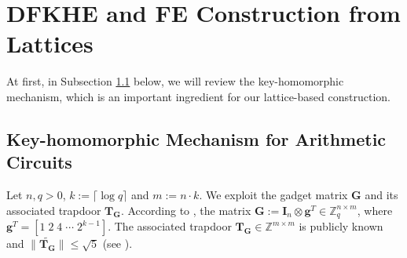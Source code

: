 \documentclass[runningheads,10pt]{llncs}
\begin{document}
\section{DFKHE and FE Construction from Lattices} \label{instan}

At first, in Subsection \ref{gad} below, we will review the key-homomorphic mechanism,
which is an important ingredient for our lattice-based construction. %

\subsection{Key-homomorphic Mechanism for Arithmetic Circuits} \label{gad}
\iffalse
\begin{lemma}[Bit decomposition]
	$\mathbf{K} \leftarrow \mathsf{BitDec}(\mathbf{A})$:  
	This is a DPT algorithm that takes a matrix $\mathbf{A}\in \mathbb{Z}_q^{n \times m}$ as its input and
	returns a matrix $\mathbf{R}\in \mathbb{Z}_q^{m \times m}$, in which each element $a \in \mathbb{Z}_q$ of $\mathbf{A}$ 
	is decomposed into a column binary vector $\mathbf{r}=[a_0 \cdots a_{k-1}]^T\in \mathbb{Z}_q^{k}$, where the bits $a_i$'s are ordered from least significant bit to most significant bit.
\end{lemma}

\begin{lemma}[{\cite[Claim 2.3]{BGG+14}}]
	Given a matrix $\mathbf{A} \in \mathbb{Z}_q^{n \times m}$ and $\mathbf{K} =\mathsf{BitDec}(\mathbf{A})$.  
	Then, $\| \mathbf{K}\|_{\text{sup}}\leq m$ and $\| \mathbf{K}^T\|_{\text{sup}} \leq m$.
\end{lemma}
\fi
Let $n, q>0$, $k:=\lceil \log q \rceil$ and $m:=n\cdot k$. 
We exploit the gadget matrix $\textbf{G}$ and its associated trapdoor $\textbf{T}_{\textbf{G}}$.
According to \cite[Section 4]{MP12}, the matrix $\textbf{G}:=\textbf{I}_n\otimes\textbf{g}^T\in \mathbb{Z}_q^{n \times m}$, 
where $\textbf{g}^T=[1 \; 2\; 4 \; \cdots\;  2^{k-1}]$. 
The associated trapdoor $\textbf{T}_{\textbf{G}}\in \mathbb{Z}^{m \times m}$ is publicly known and 
$\| \widetilde{\textbf{T}_{\textbf{G}}}\| \leq \sqrt{5}$ (see \cite[Theorem 4.1]{MP12}). \\
\end{document}
